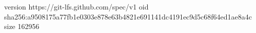 version https://git-lfs.github.com/spec/v1
oid sha256:a9508175a77fb1e0303e878e63b4821e691141dc4191ec9d5c68f64ed1ae8a4c
size 162956

